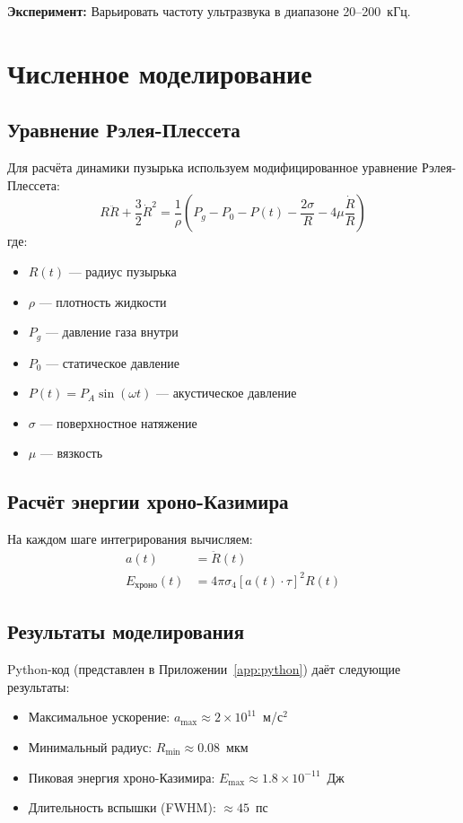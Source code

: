 \documentclass[12pt,a4paper]{article}
\begin{document}
\textbf{Эксперимент:} Варьировать частоту ультразвука в диапазоне 20--200~кГц.

\section{Численное моделирование}
\label{sec:numerics}

\subsection{Уравнение Рэлея-Плессета}

Для расчёта динамики пузырька используем модифицированное уравнение Рэлея-Плессета:
\begin{equation}
R\ddot{R} + \frac{3}{2}\dot{R}^2 = \frac{1}{\rho}\left(P_g - P_0 - P(t) - \frac{2\sigma}{R} - 4\mu\frac{\dot{R}}{R}\right)
\end{equation}
где:
\begin{itemize}
    \item $R(t)$ — радиус пузырька
    \item $\rho$ — плотность жидкости
    \item $P_g$ — давление газа внутри
    \item $P_0$ — статическое давление
    \item $P(t) = P_A \sin(\omega t)$ — акустическое давление
    \item $\sigma$ — поверхностное натяжение
    \item $\mu$ — вязкость
\end{itemize}

\subsection{Расчёт энергии хроно-Казимира}

На каждом шаге интегрирования вычисляем:
\begin{align}
a(t) &= \ddot{R}(t) \\
E_{\text{хроно}}(t) &= 4\pi \sigma_4 [a(t) \cdot \tau]^2 R(t)
\end{align}

\subsection{Результаты моделирования}

Python-код (представлен в Приложении~\ref{app:python}) даёт следующие результаты:
\begin{itemize}
    \item Максимальное ускорение: $a_{\text{max}} \approx 2 \times 10^{11}$~м/с$^2$
    \item Минимальный радиус: $R_{\text{min}} \approx 0.08$~мкм
    \item Пиковая энергия хроно-Казимира: $E_{\text{max}} \approx 1.8 \times 10^{-11}$~Дж
    \item Длительность вспышки (FWHM): $\approx 45$~пс
\end{itemize}
\end{document}
